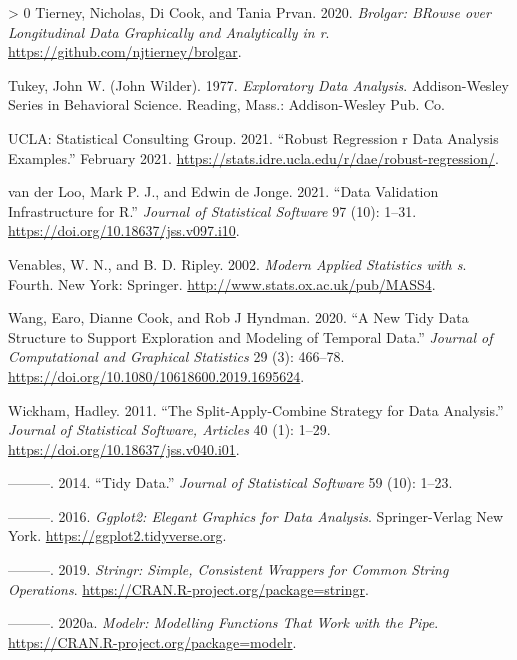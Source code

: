 \documentclass{article}
\newlength{\cslhangindent}
\newenvironment{CSLReferences}[3] %
 {%
  \setlength{\parindent}{0pt}
  \ifodd #1 \everypar{\setlength{\hangindent}{\cslhangindent}}\ignorespaces\fi
  \ifnum #2 > 0
  \setlength{\parskip}{#2\baselineskip}
  \fi
 }%
 {}
\begin{document}
\begin{CSLReferences}{1}{0}
\leavevmode\hypertarget{ref-brolgar}{}%
Tierney, Nicholas, Di Cook, and Tania Prvan. 2020. \emph{Brolgar: BRowse over Longitudinal Data Graphically and Analytically in r}. \url{https://github.com/njtierney/brolgar}.

\leavevmode\hypertarget{ref-tukey}{}%
Tukey, John W. (John Wilder). 1977. \emph{Exploratory Data Analysis}. Addison-Wesley Series in Behavioral Science. Reading, Mass.: Addison-Wesley Pub. Co.

\leavevmode\hypertarget{ref-rlm}{}%
UCLA: Statistical Consulting Group. 2021. {``Robust Regression \textbar{} r Data Analysis Examples.''} February 2021. \url{https://stats.idre.ucla.edu/r/dae/robust-regression/}.

\leavevmode\hypertarget{ref-validate}{}%
van der Loo, Mark P. J., and Edwin de Jonge. 2021. {``Data Validation Infrastructure for {R}.''} \emph{Journal of Statistical Software} 97 (10): 1--31. \url{https://doi.org/10.18637/jss.v097.i10}.

\leavevmode\hypertarget{ref-mass}{}%
Venables, W. N., and B. D. Ripley. 2002. \emph{Modern Applied Statistics with s}. Fourth. New York: Springer. \url{http://www.stats.ox.ac.uk/pub/MASS4}.

\leavevmode\hypertarget{ref-tsibble}{}%
Wang, Earo, Dianne Cook, and Rob J Hyndman. 2020. {``A New Tidy Data Structure to Support Exploration and Modeling of Temporal Data.''} \emph{Journal of Computational and Graphical Statistics} 29 (3): 466--78. \url{https://doi.org/10.1080/10618600.2019.1695624}.

\leavevmode\hypertarget{ref-plyr}{}%
Wickham, Hadley. 2011. {``The Split-Apply-Combine Strategy for Data Analysis.''} \emph{Journal of Statistical Software, Articles} 40 (1): 1--29. \url{https://doi.org/10.18637/jss.v040.i01}.

\leavevmode\hypertarget{ref-WickhamHadley2014TD}{}%
---------. 2014. {``Tidy Data.''} \emph{Journal of Statistical Software} 59 (10): 1--23.

\leavevmode\hypertarget{ref-ggplot2}{}%
---------. 2016. \emph{Ggplot2: Elegant Graphics for Data Analysis}. Springer-Verlag New York. \url{https://ggplot2.tidyverse.org}.

\leavevmode\hypertarget{ref-stringr}{}%
---------. 2019. \emph{Stringr: Simple, Consistent Wrappers for Common String Operations}. \url{https://CRAN.R-project.org/package=stringr}.

\leavevmode\hypertarget{ref-modelr}{}%
---------. 2020a. \emph{Modelr: Modelling Functions That Work with the Pipe}. \url{https://CRAN.R-project.org/package=modelr}.


\end{CSLReferences}
\end{document}

